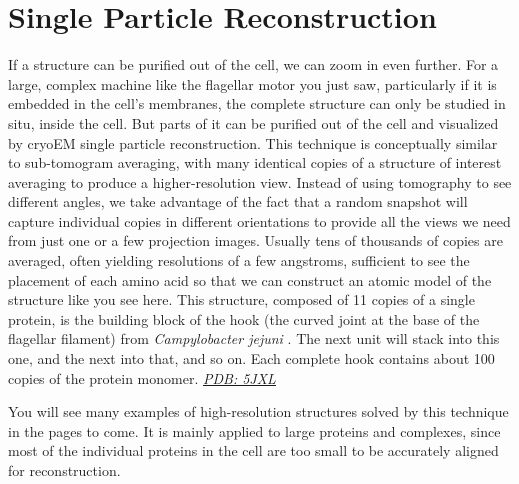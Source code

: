 \documentclass[]{tufte-book}
\begin{document}
\section{Single Particle
Reconstruction}\label{single-particle-reconstruction}

If a structure can be purified out of the cell, we can zoom in even
further. For a large, complex machine like the flagellar motor you just
saw, particularly if it is embedded in the cell's membranes, the
complete structure can only be studied in situ, inside the cell. But
parts of it can be purified out of the cell and visualized by cryoEM
single particle reconstruction. This technique is conceptually similar
to sub-tomogram averaging, with many identical copies of a structure of
interest averaging to produce a higher-resolution view. Instead of using
tomography to see different angles, we take advantage of the fact that a
random snapshot will capture individual copies in different orientations
to provide all the views we need from just one or a few projection
images. Usually tens of thousands of copies are averaged, often yielding
resolutions of a few angstroms, sufficient to see the placement of each
amino acid so that we can construct an atomic model of the structure
like you see here. This structure, composed of 11 copies of a single
protein, is the building block of the hook (the curved joint at the base
of the flagellar filament) from \emph{Campylobacter jejuni}
\citep{matsunami2016}. The next unit will stack into this one, and the
next into that, and so on. Each complete hook contains about 100 copies
of the protein monomer. \href{http://rcsb.org/structure/5JXL}{\emph{PDB:
5JXL}}

You will see many examples of high-resolution structures solved by this
technique in the pages to come. It is mainly applied to large proteins
and complexes, since most of the individual proteins in the cell are too
small to be accurately aligned for reconstruction.
\end{document}
